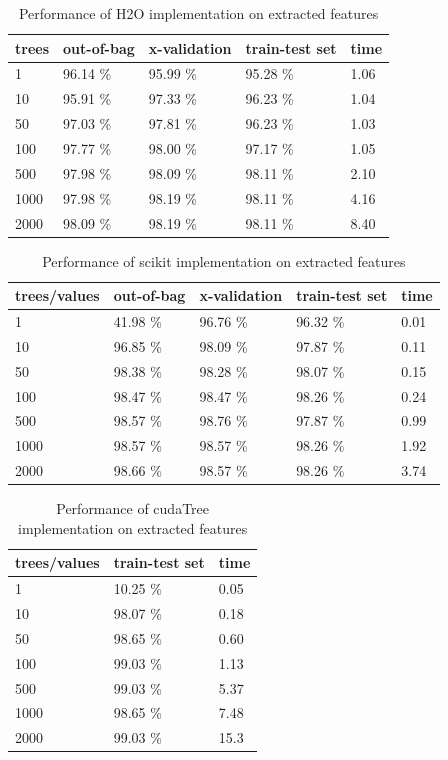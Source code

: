\documentclass[thesis=B,english]{FITthesis}[2012/10/20]
\begin{document}
\begin{table}[h]
\begin{tabular}{|l|l|l|l|l|}
\hline
trees        & out-of-bag & x-validation & train-test set & time \\ \hline
1&96.14    \%&95.99 \%&95.28 \%&1.06\\ \hline
10&95.91   \%&97.33 \%&96.23 \%&1.04\\ \hline
50&97.03   \%&97.81 \%&96.23 \%&1.03\\ \hline
100&97.77  \%&98.00 \%&97.17 \%&1.05\\ \hline
500&97.98  \%&98.09 \%&98.11 \%&2.10\\ \hline 
1000&97.98 \%&98.19 \%&98.11 \%&4.16\\ \hline
2000&98.09 \%&98.19 \%&98.11 \%&8.40\\ \hline
\end{tabular}
\caption{Performance of H2O implementation on extracted features}
\label{tab:h2o-extracted}
\end{table}
\begin{table}[h]
\begin{tabular}{|l|l|l|l|l|}
\hline
trees/values & out-of-bag & x-validation & train-test set & time \\ \hline
1&41.98    \%&96.76 \%&96.32 \%&0.01\\ \hline
10&96.85   \%&98.09 \%&97.87 \%&0.11\\ \hline
50&98.38   \%&98.28 \%&98.07 \%&0.15\\ \hline 
100&98.47  \%&98.47 \%&98.26 \%&0.24\\ \hline
500&98.57  \%&98.76 \%&97.87 \%&0.99\\ \hline
1000&98.57 \%&98.57 \%&98.26 \%&1.92\\ \hline
2000&98.66 \%&98.57 \%&98.26 \%&3.74\\ \hline
\end{tabular}
\caption{Performance of scikit implementation on extracted features}
\label{tab:scikit-extracted}
\end{table}
\begin{table}[h]
\begin{tabular}{|l|l|l|}
\hline
trees/values & train-test set & time \\ \hline
1&10.25    \%&0.05\\ \hline
10&98.07   \%&0.18\\ \hline
50&98.65   \%&0.60\\ \hline
100&99.03  \%&1.13\\ \hline
500&99.03  \%&5.37\\ \hline
1000&98.65 \%&7.48\\ \hline
2000&99.03 \%&15.3\\ \hline 
\end{tabular}
\caption{Performance of cudaTree implementation on extracted features}
\label{tab:cuda-extracted}
\end{table}
\end{document}
